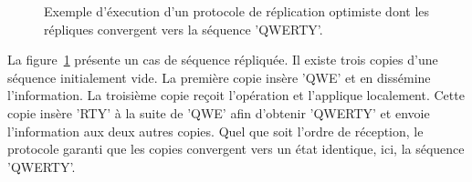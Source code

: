 \begin{figure}
  \centering
  
  \caption{\label{repl:fig:optimisticexample} Exemple d'éxecution d'un protocole
    de réplication optimiste dont les répliques convergent vers la séquence
    'QWERTY'.}
\end{figure}

La figure~\ref{repl:fig:optimisticexample} présente un cas de séquence
répliquée.  Il existe trois copies d'une séquence initialement vide. La première
copie insère 'QWE' et en dissémine l'information. La troisième copie reçoit
l'opération et l'applique localement. Cette copie insère 'RTY' à la suite de
'QWE' afin d'obtenir 'QWERTY' et envoie l'information aux deux autres
copies. Quel que soit l'ordre de réception, le protocole garanti que les copies
convergent vers un état identique, ici, la séquence 'QWERTY'.

